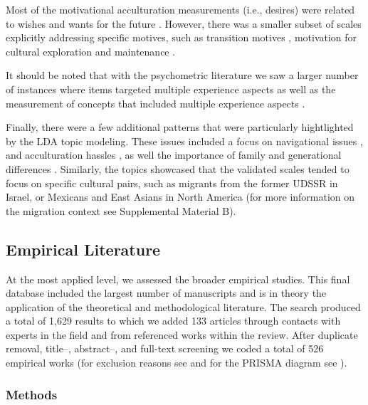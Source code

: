 Most of the motivational acculturation measurements (i.e., desires) were
related to wishes and wants for the future
\citep[e.g.,][]{Mancini2014, Ben-Shalom2003}. However, there was a
smaller subset of scales explicitly addressing specific motives, such as
transition motives \citep[][]{Mchitarjan2015}, motivation for cultural
exploration and maintenance \citep[][]{Recker2017}.

It should be noted that with the psychometric literature we saw a larger
number of instances where items targeted multiple experience aspects
\citep[e.g., enjoyment of wearing traditional clothing][]{Ozer2016} as
well as the measurement of concepts that included multiple experience
aspects \citep[e.g., satisfaction][]{Cuellar1995a}.

Finally, there were a few additional patterns that were particularly
hightlighted by the LDA topic modeling. These issues included a focus on
navigational issues \citep[e.g.,][]{Harder2018}, and acculturation
hassles \citep[e.g.,][]{Vinokurov2002}, as well the importance of family
and generational differences \citep[e.g.,][]{ICSEYteam2006, Lee2004b}.
Similarly, the topics showcased that the validated scales tended to
focus on specific cultural pairs, such as migrants from the former UDSSR
in Israel, or Mexicans and East Asians in North America (for more
information on the migration context see Supplemental Material B).

\color{black}

\subsection{Empirical Literature}

At the most applied level, we assessed the broader empirical studies.
This final database included the largest number of manuscripts and is in
theory the application of the theoretical and methodological literature.
The search produced a total of 1,629 results to which we added 133
articles through contacts with experts in the field and from referenced
works within the review. After duplicate removal, title--, abstract--,
and full-text screening we coded a total of 526 empirical works (for
exclusion reasons see  and for the PRISMA
diagram see ).

\subsubsection{Methods}

